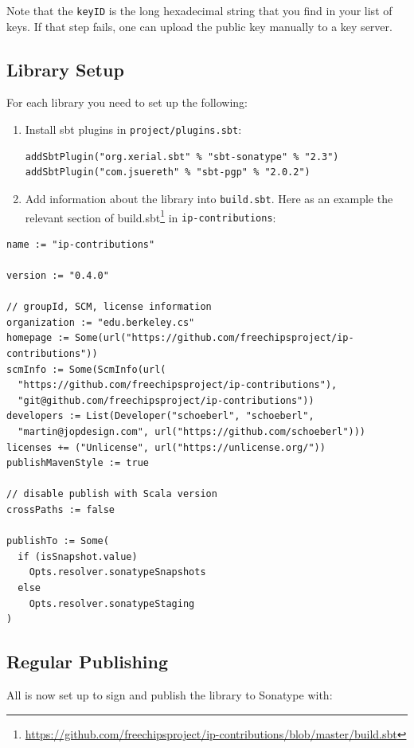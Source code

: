 \documentclass[%
    10pt,
    headinclude, footexclude,
    openright, %
    notitlepage,
    cleardoubleempty,
    headsepline,
    pointlessnumbers,
    bibtotoc, idxtotoc,
    ]{scrbook}
\newcommand{\code}[1]{{\lstinline[basicstyle=\small\ttfamily]{#1}}}
\newcommand{\myref}[2]{\href{#1}{#2}}
\renewcommand{\myref}[2]{{#2}{\footnote{\url{#1}}}}
\begin{document}
Note that the \code{keyID} is the long hexadecimal string that you find in your list of keys.
If that step fails, one can upload the public key manually to a key server.

\subsection{Library Setup}

For each library you need to set up the following:

\begin{enumerate}
\item Install sbt plugins in \code{project/plugins.sbt}:
\begin{verbatim}
addSbtPlugin("org.xerial.sbt" % "sbt-sonatype" % "2.3")
addSbtPlugin("com.jsuereth" % "sbt-pgp" % "2.0.2")
\end{verbatim}
\item Add information about the library into \code{build.sbt}. Here as an example
the relevant section of \myref{https://github.com/freechipsproject/ip-contributions/blob/master/build.sbt}{build.sbt}
in \code{ip-contributions}:
\end{enumerate}

{\small
\begin{verbatim}
name := "ip-contributions"

version := "0.4.0"

// groupId, SCM, license information
organization := "edu.berkeley.cs"
homepage := Some(url("https://github.com/freechipsproject/ip-contributions"))
scmInfo := Some(ScmInfo(url(
  "https://github.com/freechipsproject/ip-contributions"),
  "git@github.com/freechipsproject/ip-contributions"))
developers := List(Developer("schoeberl", "schoeberl",
  "martin@jopdesign.com", url("https://github.com/schoeberl")))
licenses += ("Unlicense", url("https://unlicense.org/"))
publishMavenStyle := true

// disable publish with Scala version
crossPaths := false

publishTo := Some(
  if (isSnapshot.value)
    Opts.resolver.sonatypeSnapshots
  else
    Opts.resolver.sonatypeStaging
)
\end{verbatim}
}

\subsection{Regular Publishing}

All is now set up to sign and publish the library to Sonatype with:
\end{document}
